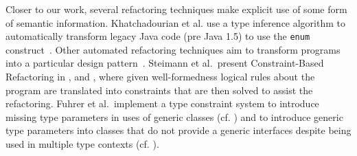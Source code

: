 \documentclass[sigconf,review,anonymous]{acmart}
\begin{document}
Closer to our work, several refactoring techniques make explicit use of some form of semantic information.
Khatchadourian et al. use a type inference algorithm to automatically transform legacy Java code (pre Java 1.5) to use the \texttt{enum} construct~\cite{sawin}.
Other automated refactoring techniques aim to transform programs into a particular design pattern~\cite{chris,bae}.
%
%
%
%
Steimann et al.~present Constraint-Based Refactoring in \cite{Steimann2011},
\cite{Steimann2012Pilgrim} and \cite{Steimann2011KollePilgrim},
where given well-formedness logical rules about the program are translated into constraints that are then solved to assist the refactoring.
%
Fuhrer et al.~implement a type constraint system to introduce missing type
parameters in uses of generic classes (cf. \cite{DBLP:conf/ecoop/FuhrerTKDK05})
and to introduce generic type parameters into classes that do not provide
a generic interfaces despite being used in multiple type contexts
(cf. \cite{DBLP:conf/icse/KiezunETF07}).
%
%
\end{document}
